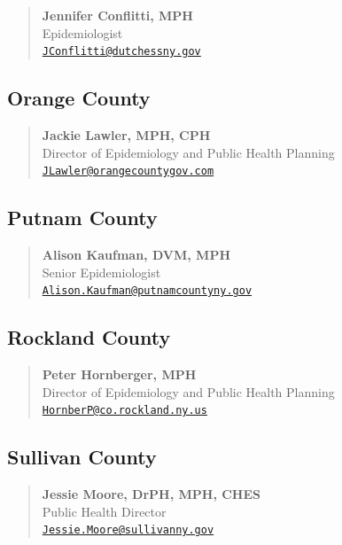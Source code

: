 \documentclass[
  english,
  letterpaper,
]{report}
\begin{document}
\begin{quote}
\textbf{Jennifer Conflitti, MPH}\\
Epidemiologist\\
\href{mailto:JConflitti@dutchessny.gov}{\nolinkurl{JConflitti@dutchessny.gov}}
\end{quote}

\subsection{Orange County}\label{orange-county}

\begin{quote}
\textbf{Jackie Lawler, MPH, CPH}\\
Director of Epidemiology and Public Health Planning\\
\href{mailto:JLawler@orangecountygov.com}{\nolinkurl{JLawler@orangecountygov.com}}
\end{quote}

\subsection{Putnam County}\label{putnam-county}

\begin{quote}
\textbf{Alison Kaufman, DVM, MPH}\\
Senior Epidemiologist\\
\href{mailto:Alison.Kaufman@putnamcountyny.gov}{\nolinkurl{Alison.Kaufman@putnamcountyny.gov}}
\end{quote}

\subsection{Rockland County}\label{rockland-county}

\begin{quote}
\textbf{Peter Hornberger, MPH}\\
Director of Epidemiology and Public Health Planning\\
\href{mailto:HornberP@co.rockland.ny.us}{\nolinkurl{HornberP@co.rockland.ny.us}}
\end{quote}

\subsection{Sullivan County}\label{sullivan-county}

\begin{quote}
\textbf{Jessie Moore, DrPH, MPH, CHES}\\
Public Health Director\\
\href{mailto:Jessie.Moore@sullivanny.gov}{\nolinkurl{Jessie.Moore@sullivanny.gov}}
\end{quote}
\end{document}
